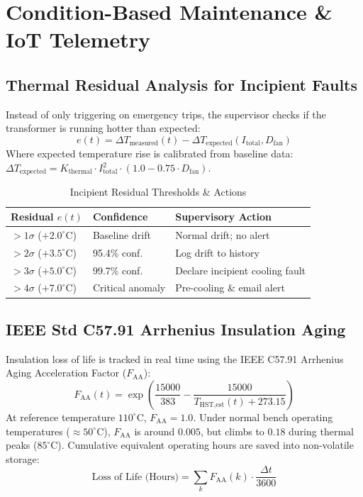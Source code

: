 \documentclass[conference]{IEEEtran}
\begin{document}
\section{Condition-Based Maintenance \& IoT Telemetry}

\subsection{Thermal Residual Analysis for Incipient Faults}
Instead of only triggering on emergency trips, the supervisor checks if the transformer is running hotter than expected:
\begin{equation}
e(t) = \Delta T_{\text{measured}}(t) - \Delta T_{\text{expected}}(I_{\text{total}}, D_{\text{fan}})
\end{equation}
Where expected temperature rise is calibrated from baseline data: $\Delta T_{\text{expected}} = K_{\text{thermal}} \cdot I_{\text{total}}^2 \cdot (1.0 - 0.75 \cdot D_{\text{fan}})$.

\begin{table}[htbp]
\caption{Incipient Residual Thresholds \& Actions}
\begin{center}
\begin{tabular}{lll}
\toprule
\textbf{Residual $e(t)$} & \textbf{Confidence} & \textbf{Supervisory Action} \\
\midrule
$> 1\sigma$ ($+2.0^\circ\text{C}$) & Baseline drift & Normal drift; no alert \\
$> 2\sigma$ ($+3.5^\circ\text{C}$) & 95.4\% conf. & Log drift to history \\
$> 3\sigma$ ($+5.0^\circ\text{C}$) & 99.7\% conf. & Declare incipient cooling fault \\
$> 4\sigma$ ($+7.0^\circ\text{C}$) & Critical anomaly & Pre-cooling \& email alert \\
\bottomrule
\end{tabular}
\label{tab2}
\end{center}
\end{table}

\subsection{IEEE Std C57.91 Arrhenius Insulation Aging}
Insulation loss of life is tracked in real time using the IEEE C57.91 Arrhenius Aging Acceleration Factor ($F_{\text{AA}}$):
\begin{equation}
F_{\text{AA}}(t) = \exp\left(\frac{15000}{383} - \frac{15000}{T_{\text{HST,est}}(t) + 273.15}\right)
\end{equation}
At reference temperature $110^\circ\text{C}$, $F_{\text{AA}} = 1.0$. Under normal bench operating temperatures ($\approx 50^\circ\text{C}$), $F_{\text{AA}}$ is around $0.005$, but climbs to $0.18$ during thermal peaks ($85^\circ\text{C}$). Cumulative equivalent operating hours are saved into non-volatile storage:
\begin{equation}
\text{Loss of Life (Hours)} = \sum_{k} F_{\text{AA}}(k) \cdot \frac{\Delta t}{3600}
\end{equation}
\end{document}
